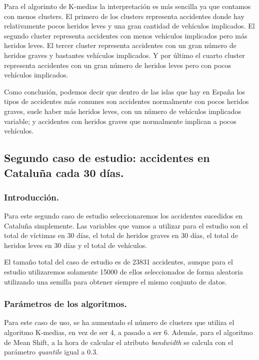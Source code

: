 	\vspace{0.06in}
	Para el algorimto de K-medias la interpretación es más sencilla ya que contamos con menos clusters. El primero de los clusters representa accidentes donde hay relativamente pocos heridos leves y una gran cantidad de vehículos implicados. El segundo cluster representa accidentes con menos vehículos implicados pero más heridos leves. El tercer cluster representa accidentes con un gran número de heridos graves y bastantes vehículos implicados. Y por último el cuarto cluster representa accidentes con un gran número de heridos leves pero con pocos vehículos implicados.
	
	\vspace{0.06in}
	Como conclusión, podemos decir que dentro de las islas que hay en España los tipos de accidentes más comunes son accidentes normalmente con pocos heridos graves, suele haber más heridos leves, con un número de vehículos implicados variable; y accidentes con heridos graves que normalmente implican a pocos vehículos.
	
	
	\subsection[Caso de estudio 2]{Segundo caso de estudio: accidentes en Cataluña cada 30 días.}
	\subsubsection{Introducción.}
	Para este segundo caso de estudio seleccionaremos los accidentes sucedidos en Cataluña simplemente. Las variables que vamos a utilizar para el estudio son el total de víctimas en 30 días, el total de heridos graves en 30 días, el total de heridos leves en 30 días y el total de vehículos.
	
	\vspace{0.06in}
	
	El tamaño total del caso de estudio es de 23831 accidentes, aunque para el estudio utilizaremos solamente 15000 de ellos seleccionados de forma aleatoria utilizando una semilla para obtener siempre el mismo conjunto de datos. 
	
	\subsubsection{Parámetros de los algoritmos.}
	Para este caso de uso, se ha aumentado el número de clusters que utiliza el algoritmo K-medias, en vez de ser 4, a pasado a ser 6.
	Además, para el algoritmo de Mean Shift, a la hora de calcular el atributo \textit{bandwidth} se calcula con el parámetro \textit{quantile} igual a 0.3.
	
